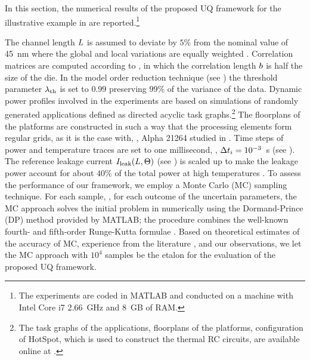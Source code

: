 In this section, the numerical results of the proposed UQ framework for the illustrative example in  are reported.\footnote{The experiments are coded in MATLAB and conducted on a machine with Intel Core i7 2.66~GHz and 8~GB of RAM.}

The channel length $L$ is assumed to deviate by $5\%$ from the nominal value of 45~nm where the global and local variations are equally weighted \cite{juan2011, juan2012}. Correlation matrices are computed according to , in which the correlation length $b$ is half the size of the die. In the model order reduction technique (see ) the threshold parameter $\lambda_\text{th}$ is set to $0.99$ preserving $99\%$ of the variance of the data. Dynamic power profiles involved in the experiments are based on simulations of randomly generated applications defined as directed acyclic task graphs.\footnote{The task graphs of the applications, floorplans of the platforms, configuration of HotSpot, which is used to construct the thermal RC circuits, are available online at \cite{sources}.} The floorplans of the platforms are constructed in such a way that the processing elements form regular grids, as it is the case with, \eg, Alpha 21264 studied in \cite{juan2011}. Time steps of power and temperature traces are set to one millisecond, \ie, $\Delta t_i = 10^{-3}$~s (see ). The reference leakage current $I_{\text{leak}}(L, \Theta)$ (see ) is scaled up to make the leakage power account for about $40\%$ of the total power at high temperatures \cite{liu2007}. To assess the performance of our framework, we employ a Monte Carlo (MC) sampling technique. For each sample, \ie, for each outcome of the uncertain parameters, the MC approach solves the initial problem in  numerically using the Dormand-Prince (DP) method provided by MATLAB; the procedure combines the well-known fourth- and fifth-order Runge-Kutta formulae \cite{press2007}. Based on theoretical estimates \cite{diaz-emparanza2002} of the accuracy of MC, experience from the literature \cite{xiu2010, eldred2009, maitre2010, shen2009}, and our observations, we let the MC approach with $10^4$ samples be the etalon for the evaluation of the proposed UQ framework.

